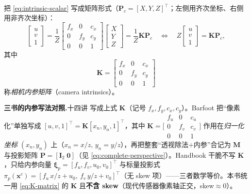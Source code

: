 \begin{definition}[内参矩阵]\label{def:K}
把 \cref{eq:intrinsic-scalar} 写成矩阵形式（$\mathbf{P}_c=[X,Y,Z]^\top$；左侧用齐次坐标、右侧用非齐次坐标）：
\begin{equation}
  \begin{bmatrix}u\\v\\1\end{bmatrix}
  =\frac{1}{Z}\begin{bmatrix}f_x&0&c_x\\0&f_y&c_y\\0&0&1\end{bmatrix}
  \begin{bmatrix}X\\Y\\Z\end{bmatrix}
  =\frac{1}{Z}\mathbf{K}\mathbf{P}_c
  \quad\Longleftrightarrow\quad
  Z\begin{bmatrix}u\\v\\1\end{bmatrix}=\mathbf{K}\mathbf{P}_c,
  \label{eq:K}
\end{equation}
其中
\begin{equation}
  \mathbf{K}=\begin{bmatrix}f_x&0&c_x\\0&f_y&c_y\\0&0&1\end{bmatrix}
  \label{eq:K-matrix}
\end{equation}
称\emph{相机内参矩阵}（camera intrinsics）。
\end{definition}

\begin{note}
\textbf{三书的内参写法对照.}\;十四讲\cite{gaoxiang2019slam14} 写成上式 $\mathbf{K}$（记号 $f_x,f_y,c_x,c_y$）。Barfoot\cite{barfoot2024state} 把“像素化”单独写成 $[u,v,1]^\top=\mathbf{K}[x_n,y_n,1]^\top$，其中 $\mathbf{K}=\big[\begin{smallmatrix}f_u&0&c_u\\0&f_v&c_v\\0&0&1\end{smallmatrix}\big]$ 作用在\emph{归一化坐标} $(x_n,y_n)$ 上（$x_n=x/z,\,y_n=y/z$），再把整套“透视除法$+$内参”合记为 $\mathbf{M}$ 与投影矩阵 $\mathbf{P}=[\mathbf{I}_2\;\mathbf{0}]$（见 \cref{eq:complete-perspective}）。Handbook\cite{carlone2026handbook} 干脆不写 $\mathbf{K}$，只给内参向量 $\boldsymbol\xi_p=[f_u,f_v,u_0,v_0]^\top$ 与标量投影式 $\pi_p(\mathbf{x}^c)=[f_u\,x/z+u_0,\ f_v\,y/z+v_0]^\top$（无 skew 项）——三者数学等价。本书统一用 \cref{eq:K-matrix} 的 $\mathbf{K}$ 且\textbf{不含 skew}（现代传感器像素轴正交，skew$\approx 0$）。
\end{note}

